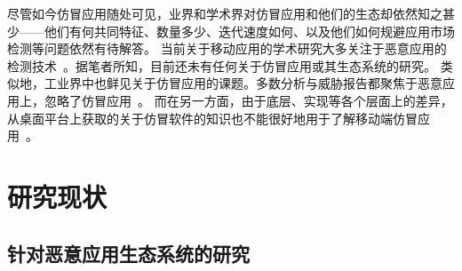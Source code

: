尽管如今仿冒应用随处可见，业界和学术界对仿冒应用和他们的生态却依然知之甚少——他们有何共同特征、数量多少、迭代速度如何、以及他们如何规避应用市场检测等问题依然有待解答。
当前关于移动应用的学术研究大多关注于恶意应用的检测技术~\cite{chen2016stormdroid,chen2018automated, chen2016towards, fan2016poster}。据笔者所知，目前还未有任何关于仿冒应用或其生态系统的研究。
类似地，工业界中也鲜见关于仿冒应用的课题。多数分析与威胁报告都聚焦于恶意应用上，忽略了仿冒应用~\cite{McAfee_mobile_thread_report}。
而在另一方面，由于底层、实现等各个层面上的差异，从桌面平台上获取的关于仿冒软件的知识也不能很好地用于了解移动端仿冒应用~\cite{yin2007panorama}。

\section{研究现状}

\subsection{针对恶意应用生态系统的研究}

